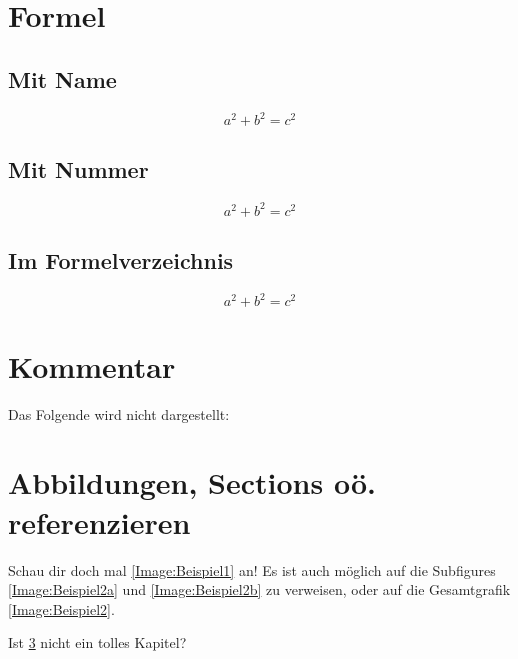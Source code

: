 \section{Formel}
\subsection{Mit Name}
\begin{equation}
	\tag{Satz des Pythagoras}
	a^2 + b^2 = c^2
	\label{equation:SatzDesPythagoras}
\end{equation}

\subsection{Mit Nummer}
\begin{equation}
	a^2 + b^2 = c^2
	\label{equation:SatzDesPythagoras}
\end{equation}

\subsection{Im Formelverzeichnis}
\begin{equation}
	a^2+b^2=c^2
\end{equation}

\section{Kommentar}
Das Folgende wird nicht dargestellt: 

\section{Abbildungen, Sections oö. referenzieren}
\label{Section:cref}

Schau dir doch mal \cref{Image:Beispiel1} an!
Es ist auch möglich auf die Subfigures \cref{Image:Beispiel2a} und \cref{Image:Beispiel2b} zu verweisen, oder auf die Gesamtgrafik \cref{Image:Beispiel2}.

Ist \cref{Section:cref} nicht ein tolles Kapitel?
